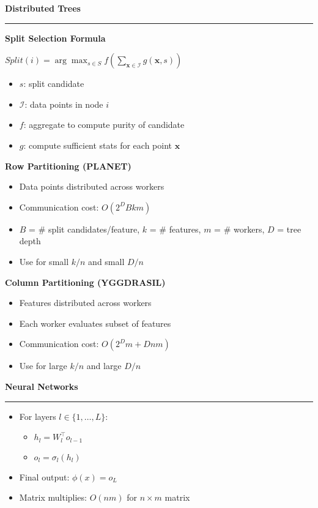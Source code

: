 \documentclass[8pt,letter,landscape]{article}
\newcommand{\sectiontitle}[1]{\textbf{\large #1}\vspace{0.2em}\hrule\vspace{0.5em}}
\begin{document}
\begin{multicols*}{3}

\sectiontitle{Distributed Trees}

\textbf{Split Selection Formula}

$Split(i) = \arg\max_{s \in S} f(\sum_{\mathbf{x} \in \mathcal{I}} g(\mathbf{x}, s))$

\begin{itemize}[leftmargin=*,nosep]
    \item $s$: split candidate
    \item $\mathcal{I}$: data points in node $i$
    \item $f$: aggregate to compute purity of candidate
    \item $g$: compute sufficient stats for each point $\mathbf{x}$
\end{itemize}

\textbf{Row Partitioning (PLANET)}
\begin{itemize}[leftmargin=*,nosep]
    \item Data points distributed across workers
    \item Communication cost: $O(2^D B k m)$
    \item $B$ = \# split candidates/feature, $k$ = \# features, $m$ = \# workers, $D$ = tree depth
    \item Use for small $k/n$ and small $D/n$
\end{itemize}

\textbf{Column Partitioning (YGGDRASIL)}
\begin{itemize}[leftmargin=*,nosep]
    \item Features distributed across workers
    \item Each worker evaluates subset of features
    \item Communication cost: $O(2^D m + D n m)$
    \item Use for large $k/n$ and large $D/n$
\end{itemize}

\sectiontitle{Neural Networks}

\begin{itemize}[leftmargin=*,nosep]
    \item For layers $l \in \{1,\dots,L\}$:
    \begin{itemize}[leftmargin=*,nosep]
        \item $h_l = W_l^\top o_{l-1}$ 
        \item $o_l = \sigma_l(h_l)$
    \end{itemize}
    \item Final output: $\phi(x) = o_L$
    \item Matrix multiplies: $O(nm)$ for $n \times m$ matrix
\end{itemize}


\end{multicols*}
\end{document}
